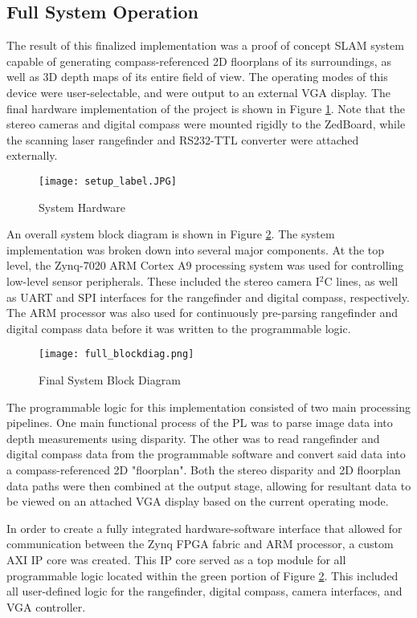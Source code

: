 \subsection{Full System Operation}
The result of this finalized implementation was a proof of concept SLAM system capable of generating compass-referenced 2D floorplans of its surroundings, as well as 3D depth maps of its entire field of view. The operating modes of this device were user-selectable, and were output to an external VGA display. The final hardware implementation of the project is shown in Figure \ref{finalHW}. Note that the stereo cameras and digital compass were mounted rigidly to the ZedBoard, while the scanning laser rangefinder and RS232-TTL converter were attached externally.
\par
\begin{figure}[H]
	\centerline{
	\texttt{[image: setup\_label.JPG]}
	}
	\caption{System Hardware}
	\label{finalHW}
\end{figure}
\par
An overall system block diagram is shown in Figure \ref{systemBD2}. The system implementation was broken down into several major components. At the top level, the Zynq-7020 ARM Cortex A9 processing system was used for controlling low-level sensor peripherals. These included the stereo camera I$^2$C lines, as well as UART and SPI interfaces for the rangefinder and digital compass, respectively. The ARM processor was also used for continuously pre-parsing rangefinder and digital compass data before it was written to the programmable logic.
\par
\begin{figure}[H]
	\centerline{
	\texttt{[image: full\_blockdiag.png]}
	}
	\caption{Final System Block Diagram}
	\label{systemBD2}
\end{figure}
\par
The programmable logic for this implementation consisted of two main processing pipelines. One main functional process of the PL was to parse image data into depth measurements using disparity. The other was to read rangefinder and digital compass data from the programmable software and convert said data into a compass-referenced 2D "floorplan". Both the stereo disparity and 2D floorplan data paths were then combined at the output stage, allowing for resultant data to be viewed on an attached VGA display based on the current operating mode.
\par
In order to create a fully integrated hardware-software interface that allowed for communication between the Zynq FPGA fabric and ARM processor, a custom AXI IP core was created. This IP core served as a top module for all programmable logic located within the green portion of Figure \ref{systemBD2}. This included all user-defined logic for the rangefinder, digital compass, camera interfaces, and VGA controller.
